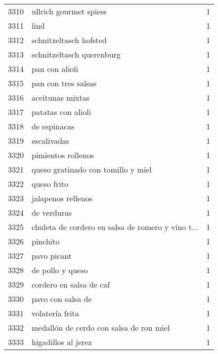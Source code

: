 \begin{tabular}{llr}
3310 &                             ullrich gourmet spiess &      1 \\
3311 &                                               lind &      1 \\
3312 &                             schnitzeltasch hofsted &      1 \\
3313 &                          schnitzeltasch querenburg &      1 \\
3314 &                                     pan con alioli &      1 \\
3315 &                                pan con tres salsas &      1 \\
3316 &                                   aceitunas mixtas &      1 \\
3317 &                                 patatas con alioli &      1 \\
3318 &                                       de espinacas &      1 \\
3319 &                                        escalivadas &      1 \\
3320 &                                 pimientos rollenos &      1 \\
3321 &                 queso gratinado con tomillo y miel &      1 \\
3322 &                                        queso frito &      1 \\
3323 &                                 jalapenos rellenos &      1 \\
3324 &                                        de verduras &      1 \\
3325 &  chuleta de cordero en salsa de romero y vino t... &      1 \\
3326 &                                           pinchito &      1 \\
3327 &                                        pavo picant &      1 \\
3328 &                                   de pollo y queso &      1 \\
3329 &                            cordero en salsa de caf &      1 \\
3330 &                                  pavo con salsa de &      1 \\
3331 &                                    volatería frita &      1 \\
3332 &            medallón de cerdo con salsa de ron miel &      1 \\
3333 &                                higadillos al jerez &      1 \\

\end{tabular}
